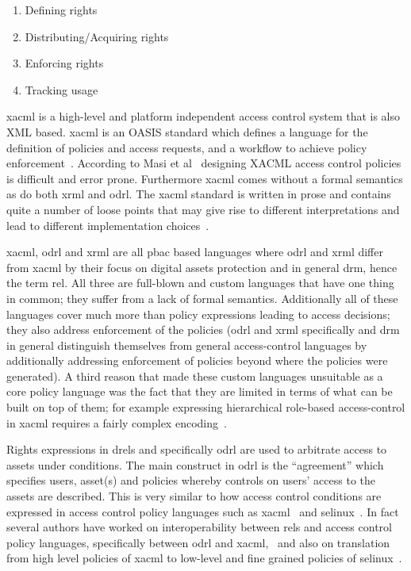 \begin{enumerate}
  \item Defining rights 
  \item Distributing/Acquiring rights 
  \item Enforcing rights 
  \item Tracking usage
\end{enumerate}

\ac{xacml} is a high-level and platform independent access control system that is also XML based. \ac{xacml} is an OASIS standard which defines a language for the definition of policies and access requests, and a workflow to achieve policy enforcement~\cite{DBLP:conf/essos/MasiPT12}. According to Masi et al~\cite{DBLP:conf/essos/MasiPT12} designing XACML access control policies is difficult and error prone. Furthermore \ac{xacml} comes without a formal semantics as do both \ac{xrml} and \ac{odrl}. The \ac{xacml} standard is written in prose and contains quite a number of loose points that may give rise to different interpretations and lead to different implementation choices~\cite{DBLP:conf/essos/MasiPT12}.

\ac{xacml}, \ac{odrl} and \ac{xrml} are all \ac{pbac} based languages where \ac{odrl} and \ac{xrml} differ from \ac{xacml} by their focus on digital assets protection and in general \ac{drm}, hence the term \ac{rel}. All three are full-blown and custom languages that have one thing in common; they suffer from a lack of formal semantics. Additionally all of these languages cover much more than policy expressions leading to access decisions; they also address enforcement of the policies (\ac{odrl} and \ac{xrml} specifically and \ac{drm} in general distinguish themselves from general access-control languages by additionally addressing enforcement of policies beyond where the policies were generated). A third reason that made these custom languages unsuitable as a core policy language was the fact that they are limited in terms of what can be built on top of them; for example expressing hierarchical role-based access-control  in \ac{xacml} requires a fairly complex encoding~\cite{Tschantz}.

Rights expressions in \ac{drel}s and specifically \ac{odrl} are used to arbitrate access to assets under conditions. The main construct in \ac{odrl} is the ``agreement'' which specifies users, asset(s) and policies whereby controls on users' access to the assets are described. This is very similar to how access control conditions are expressed in access control policy languages such as \ac{xacml}~\cite{xacml} and \ac{selinux}~\cite{selinux}. In fact several authors have worked on interoperability between \ac{rel}s and access control policy languages, specifically between \ac{odrl} and \ac{xacml},~\cite{prados2005interoperability, maronas2009architecture} and also on translation from high level policies of \ac{xacml} to low-level and fine grained policies of \ac{selinux}~\cite{alam2008usage}. 

